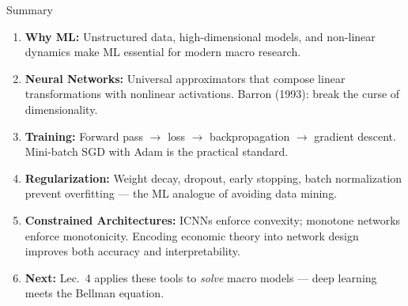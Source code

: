 \documentclass[10pt,english,aspectratio=169]{beamer}
\begin{document}
\begin{frame}{Summary}
\begin{enumerate}
\item \textbf{Why ML:} Unstructured data, high-dimensional models, and non-linear dynamics make ML essential for modern macro research.

\medskip
\item \textbf{Neural Networks:} Universal approximators that compose linear transformations with nonlinear activations. Barron (1993): break the curse of dimensionality.

\medskip
\item \textbf{Training:} Forward pass $\to$ loss $\to$ backpropagation $\to$ gradient descent. Mini-batch SGD with Adam is the practical standard.

\medskip
\item \textbf{Regularization:} Weight decay, dropout, early stopping, batch normalization prevent overfitting --- the ML analogue of avoiding data mining.

\medskip
\item \textbf{Constrained Architectures:} ICNNs enforce convexity; monotone networks enforce monotonicity. Encoding economic theory into network design improves both accuracy and interpretability.

\medskip
\item \textbf{Next:} Lec.\ 4 applies these tools to \emph{solve} macro models --- deep learning meets the Bellman equation.
\end{enumerate}
\end{frame}
\end{document}
